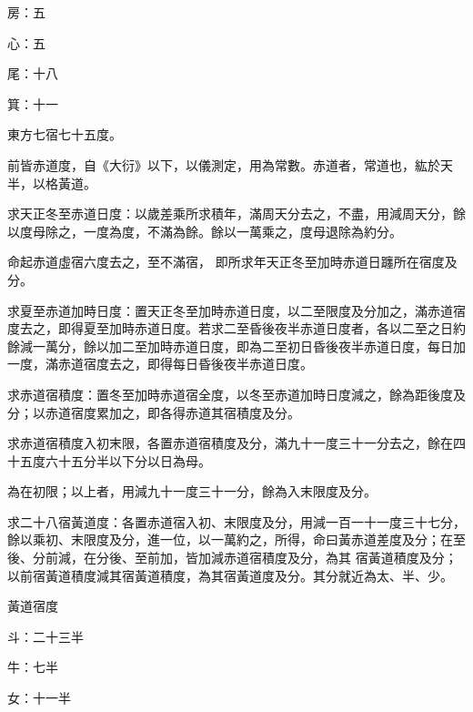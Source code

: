 \begin{pinyinscope}
 房：五



 心：五



 尾：十八



 箕：十一



 東方七宿七十五度。



 前皆赤道度，自《大衍》以下，以儀測定，用為常數。赤道者，常道也，紘於天半，以格黃道。



 求天正冬至赤道日度：以歲差乘所求積年，滿周天分去之，不盡，用減周天分，餘以度母除之，一度為度，不滿為餘。餘以一萬乘之，度母退除為約分。



 命起赤道虛宿六度去之，至不滿宿，
 即所求年天正冬至加時赤道日躔所在宿度及分。



 求夏至赤道加時日度：置天正冬至加時赤道日度，以二至限度及分加之，滿赤道宿度去之，即得夏至加時赤道日度。若求二至昏後夜半赤道日度者，各以二至之日約餘減一萬分，餘以加二至加時赤道日度，即為二至初日昏後夜半赤道日度，每日加一度，滿赤道宿度去之，即得每日昏後夜半赤道日度。



 求赤道宿積度：置冬至加時赤道宿全度，以冬至赤道加時日度減之，餘為距後度及分；以赤道宿度累加之，即各得赤道其宿積度及分。



 求赤道宿積度入初末限，各置赤道宿積度及分，滿九十一度三十一分去之，餘在四十五度六十五分半以下分以日為母。



 為在初限；以上者，用減九十一度三十一分，餘為入末限度及分。



 求二十八宿黃道度：各置赤道宿入初、末限度及分，用減一百一十一度三十七分，餘以乘初、末限度及分，進一位，以一萬約之，所得，命曰黃赤道差度及分；在至後、分前減，在分後、至前加，皆加減赤道宿積度及分，為其
 宿黃道積度及分；以前宿黃道積度減其宿黃道積度，為其宿黃道度及分。其分就近為太、半、少。



 黃道宿度



 斗：二十三半



 牛：七半



 女：十一半




\end{pinyinscope}
